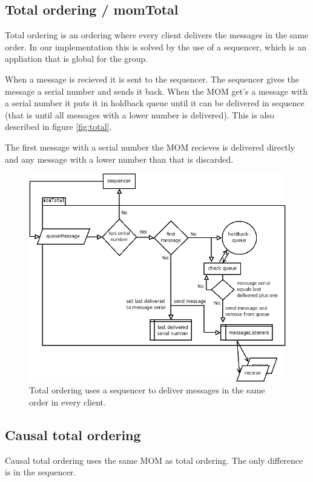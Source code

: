 \documentclass[english]{article}
\begin{document}
\subsection{Total ordering / momTotal}
Total ordering is an ordering where every client delivers the messages in the same order. In our implementation this is solved by the use of a sequencer, which is an appliation that is global for the group. 

When a message is recieved it is sent to the sequencer. The sequencer gives the message a serial number and sends it back. When the MOM get's a message with a serial number it puts it in holdback queue until it can be delivered in sequence (that is until all messages with a lower number is delivered). This is also described in figure \vref{fig:total}.

The first message with a serial number the MOM recieves is delivered directly and any message with a lower number than that is discarded.

\begin{figure}
\includegraphics[width=\textwidth]{momTotal.png}
\caption{Total ordering uses a sequencer to deliver messages in the same order in every client.}
\label{fig:total}
\end{figure}

\subsection{Causal total ordering}
Causal total ordering uses the same MOM as total ordering. The only difference is in the sequencer.
\end{document}
